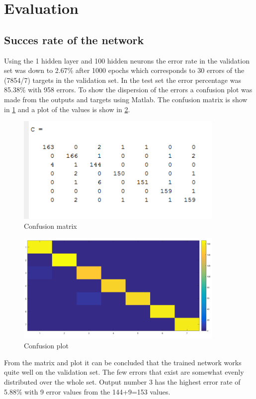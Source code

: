 \section{Evaluation} \label {chapter:evaluation}

\subsection{Succes rate of the network}
Using the 1 hidden layer and 100 hidden neurons the error rate in the validation set was down to 2.67\% after 1000 epochs which corresponds to 30 errors of the (7854/7) targets in the validation set. In the test set the error percentage was 85.38\% with 958 errors. To show the dispersion of the errors a confusion plot was made from the outputs and targets using Matlab. The confusion matrix is show in \cref{confusion_matrix} and a plot of the values is show in \cref{confusion_plot}.


\begin{figure}[!h]
\begin{center}
\includegraphics[width=10cm]{testresults/confusionmatrix.png}
\caption{Confusion matrix}
\label{confusion_matrix}
\end{center}
\end{figure}
\FloatBarrier

\begin{figure}[!h]
\begin{center}
\includegraphics[width=10cm]{testresults/confusionplot.png}
\caption{Confusion plot}
\label{confusion_plot}
\end{center}
\end{figure}
\FloatBarrier

From the matrix and plot it can be concluded that the trained network works quite well on the validation set. The few errors that exist are somewhat evenly distributed over the whole set. Output number 3 has the highest error rate of 5.88\% with 9 error values from the 144+9=153 values.

